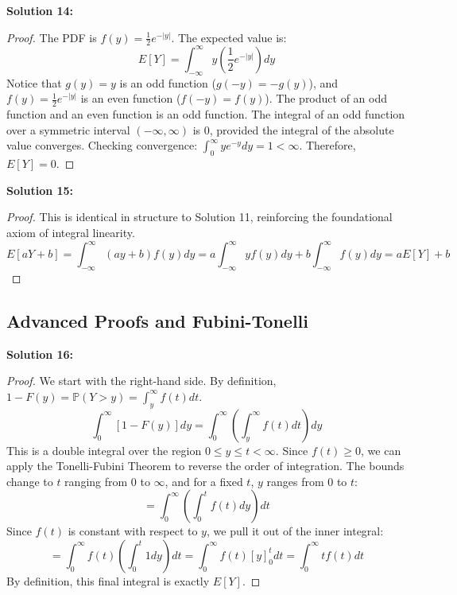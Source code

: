\documentclass[11pt, a4paper]{article}
\theoremstyle{definition}
\theoremstyle{remark}
\newcommand{\Prob}{\mathbb{P}}
\begin{document}
\textbf{Solution 14:}
\begin{proof}
The PDF is $f(y) = \frac{1}{2} e^{-|y|}$. The expected value is:
\[ E[Y] = \int_{-\infty}^\infty y \left(\frac{1}{2} e^{-|y|}\right) dy \]
Notice that $g(y) = y$ is an odd function ($g(-y) = -g(y)$), and $f(y) = \frac{1}{2} e^{-|y|}$ is an even function ($f(-y) = f(y)$). 
The product of an odd function and an even function is an odd function. 
The integral of an odd function over a symmetric interval $(-\infty, \infty)$ is $0$, provided the integral of the absolute value converges.
Checking convergence: $\int_0^\infty y e^{-y} dy = 1 < \infty$. 
Therefore, $E[Y] = 0$.
\end{proof}

\textbf{Solution 15:}
\begin{proof}
This is identical in structure to Solution 11, reinforcing the foundational axiom of integral linearity.
\[ E[aY+b] = \int_{-\infty}^\infty (ay+b)f(y) dy = a \int_{-\infty}^\infty y f(y) dy + b \int_{-\infty}^\infty f(y) dy = aE[Y] + b \]
\end{proof}

\subsection{Advanced Proofs and Fubini-Tonelli}

\textbf{Solution 16:}
\begin{proof}
We start with the right-hand side. By definition, $1 - F(y) = \Prob(Y > y) = \int_y^\infty f(t) dt$.
\[ \int_0^\infty [1 - F(y)] dy = \int_0^\infty \left( \int_y^\infty f(t) dt \right) dy \]
This is a double integral over the region $0 \le y \le t < \infty$. Since $f(t) \ge 0$, we can apply the Tonelli-Fubini Theorem to reverse the order of integration. 
The bounds change to $t$ ranging from $0$ to $\infty$, and for a fixed $t$, $y$ ranges from $0$ to $t$:
\[ = \int_0^\infty \left( \int_0^t f(t) dy \right) dt \]
Since $f(t)$ is constant with respect to $y$, we pull it out of the inner integral:
\[ = \int_0^\infty f(t) \left( \int_0^t 1 dy \right) dt = \int_0^\infty f(t) [y]_0^t dt = \int_0^\infty t f(t) dt \]
By definition, this final integral is exactly $E[Y]$.

\vspace{10pt}
\end{proof}
\end{document}

